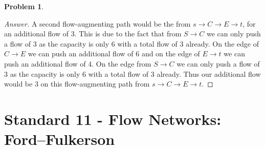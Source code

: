 \documentclass[11pt]{article}
\theoremstyle{definition}
\theoremstyle{definition}
\newtheorem{required}{Problem}
\theoremstyle{definition}
\begin{document}
\begin{required}
\begin{enumerate}[label=(\alph*)]
\begin{proof}[Answer]
A second flow-augmenting path would be the from $s \to C \to E \to t$, for an additional flow of 3. This is due to the fact that from $S \to C$ we can only push a flow of 3 as the capacity is only 6 with a total flow of 3 already. On the edge of $C \to E$ we can push an additional flow of 6 and on the edge of $E \to t$ we can push an additional flow of 4. On the edge from $S \to C$ we can only push a flow of 3 as the capacity is only 6 with a total flow of 3 already. Thus our additional flow would be 3 on this flow-augmenting path from $s \to C \to E \to t$.
\end{proof}
\end{enumerate}
\end{required}

\newpage
\section{Standard 11 - Flow Networks: Ford--Fulkerson}
\end{document}
